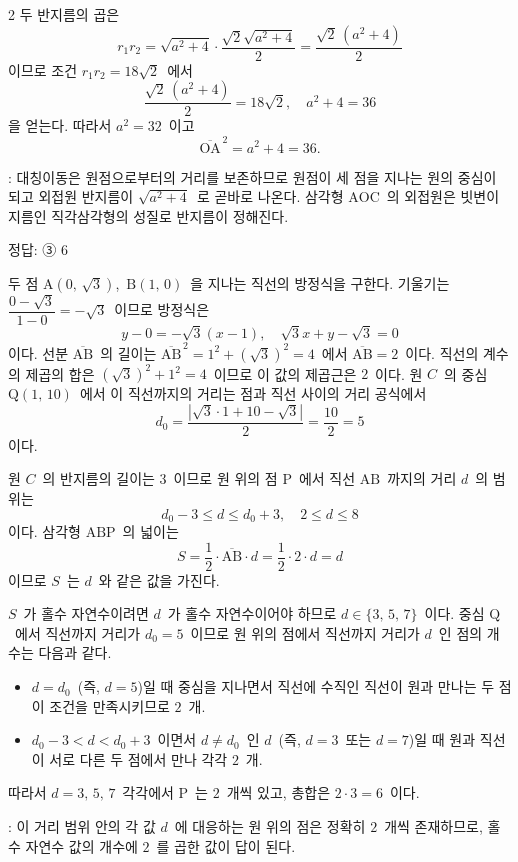 \documentclass[10pt,fleqn]{article}
\begin{document}
\begin{multicols*}{2}
두 반지름의 곱은
\[ r_1 r_2 = \sqrt{a^2+4}\cdot \dfrac{\sqrt{2}\sqrt{a^2+4}}{2} = \dfrac{\sqrt{2}\,(a^2+4)}{2} \]
이므로 조건 $r_1 r_2 = 18\sqrt{2}$\ 에서
\[ \dfrac{\sqrt{2}\,(a^2+4)}{2} = 18\sqrt{2},\quad a^2+4 = 36 \]
을 얻는다. 따라서 $a^2 = 32$\ 이고
\[ \overline{\mathrm{OA}}^{\,2} = a^2+4 = 36. \]

\begin{dmcriticalpoint}
: 대칭이동은 원점으로부터의 거리를 보존하므로 원점이 세 점을 지나는 원의 중심이 되고 외접원 반지름이 $\sqrt{a^2+4}$\ 로 곧바로 나온다. 삼각형 $\mathrm{AOC}$\ 의 외접원은 빗변이 지름인 직각삼각형의 성질로 반지름이 정해진다.
\end{dmcriticalpoint}

\begin{dmanswerbox}
정답: ③ $6$
\end{dmanswerbox}

두 점 $\mathrm{A}(0,\,\sqrt{3})$,\ $\mathrm{B}(1,\,0)$\ 을 지나는 직선의 방정식을 구한다. 기울기는 $\dfrac{0-\sqrt{3}}{1-0} = -\sqrt{3}$\ 이므로 방정식은
\[ y-0 = -\sqrt{3}(x-1),\quad \sqrt{3}x+y-\sqrt{3} = 0 \]
이다. 선분 $\overline{\mathrm{AB}}$\ 의 길이는 $\overline{\mathrm{AB}}^{\,2} = 1^2+(\sqrt{3})^2 = 4$\ 에서 $\overline{\mathrm{AB}}=2$\ 이다. 직선의 계수의 제곱의 합은 $(\sqrt{3})^2+1^2=4$\ 이므로 이 값의 제곱근은 $2$\ 이다. 원 $C$\ 의 중심 $\mathrm{Q}(1,\,10)$\ 에서 이 직선까지의 거리는 점과 직선 사이의 거리 공식에서
\[ d_0 = \dfrac{|\sqrt{3}\cdot 1+10-\sqrt{3}|}{2} = \dfrac{10}{2} = 5 \]
이다.

원 $C$\ 의 반지름의 길이는 $3$\ 이므로 원 위의 점 $\mathrm{P}$\ 에서 직선 $\mathrm{AB}$\ 까지의 거리 $d$\ 의 범위는
\[ d_0-3 \le d \le d_0+3,\quad 2 \le d \le 8 \]
이다. 삼각형 $\mathrm{ABP}$\ 의 넓이는
\[ S = \dfrac{1}{2}\cdot \overline{\mathrm{AB}}\cdot d = \dfrac{1}{2}\cdot 2\cdot d = d \]
이므로 $S$\ 는 $d$\ 와 같은 값을 가진다.

$S$\ 가 홀수 자연수이려면 $d$\ 가 홀수 자연수이어야 하므로 $d\in\{3,\,5,\,7\}$\ 이다. 중심 $\mathrm{Q}$\ 에서 직선까지 거리가 $d_0=5$\ 이므로 원 위의 점에서 직선까지 거리가 $d$\ 인 점의 개수는 다음과 같다.
\begin{itemize}[leftmargin=1.4em,itemsep=1pt,topsep=2pt]
\item $d=d_0$\ (즉, $d=5$)일 때 중심을 지나면서 직선에 수직인 직선이 원과 만나는 두 점이 조건을 만족시키므로 $2$\ 개.
\item $d_0-3 < d < d_0+3$\ 이면서 $d\ne d_0$\ 인 $d$\ (즉, $d=3$\ 또는 $d=7$)일 때 원과 직선이 서로 다른 두 점에서 만나 각각 $2$\ 개.
\end{itemize}
따라서 $d=3,\,5,\,7$\ 각각에서 $\mathrm{P}$\ 는 $2$\ 개씩 있고, 총합은 $2\cdot 3 = 6$\ 이다.

\begin{dmcriticalpoint}
: 이 거리 범위 안의 각 값 $d$\ 에 대응하는 원 위의 점은 정확히 $2$\ 개씩 존재하므로, 홀수 자연수 값의 개수에 $2$\ 를 곱한 값이 답이 된다.
\end{dmcriticalpoint}

\end{multicols*}
\end{document}
